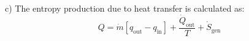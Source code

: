 c) The entropy production due to heat transfer is calculated as:  
\[
Q = \dot{m} \left[ q_{\text{out}} - q_{\text{in}} \right] + \frac{\dot{Q}_{\text{out}}}{T} + \dot{S}_{\text{gen}}
\]